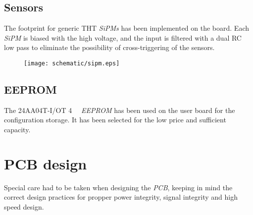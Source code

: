 \section{Sensors}
The footprint for generic THT \emph{SiPMs} has been implemented on the board. Each \emph{SiPM} is biased with the high voltage, and the input is filtered with a dual RC low pass to eliminate the possibility of cross-triggering of the sensors. 

\FloatBarrier
\begin{figure}[htp!]
    \centering
    \texttt{[image: schematic/sipm.eps]}
    \label{fig:sipm}
\end{figure}
\FloatBarrier

\section{EEPROM}
The 24AA04T-I/OT \SI{4}{\kilo\bit} \emph{EEPROM} has been used on the user board for the configuration storage. It has been selected for the low price and sufficient capacity. 

\newpage
\chapter{PCB design}
Special care had to be taken when designing the \emph{PCB}, keeping in mind the correct design practices for propper power integrity, signal integrity and high speed design. 

